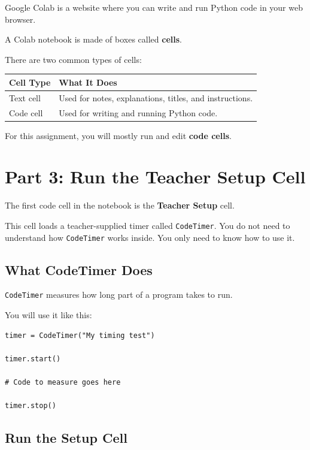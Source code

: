 \documentclass[11pt]{article}
\begin{document}
Google Colab is a website where you can write and run Python code in your web browser.

A Colab notebook is made of boxes called \textbf{cells}.

There are two common types of cells:

\begin{center}
\begin{tabular}{|>{\raggedright}p{1.8in}|>{\raggedright\arraybackslash}p{4.5in}|}
\hline
\textbf{Cell Type} & \textbf{What It Does} \\
\hline
Text cell & Used for notes, explanations, titles, and instructions. \\
\hline
Code cell & Used for writing and running Python code. \\
\hline
\end{tabular}
\end{center}

For this assignment, you will mostly run and edit \textbf{code cells}.

\section*{Part 3: Run the Teacher Setup Cell}

The first code cell in the notebook is the \textbf{Teacher Setup} cell.

This cell loads a teacher-supplied timer called \texttt{CodeTimer}. You do not need to understand how \texttt{CodeTimer} works inside. You only need to know how to use it.

\subsection*{What CodeTimer Does}

\texttt{CodeTimer} measures how long part of a program takes to run.

You will use it like this:

\begin{lstlisting}[style=pythonstyle]
timer = CodeTimer("My timing test")

timer.start()

# Code to measure goes here

timer.stop()
\end{lstlisting}

\subsection*{Run the Setup Cell}
\end{document}
